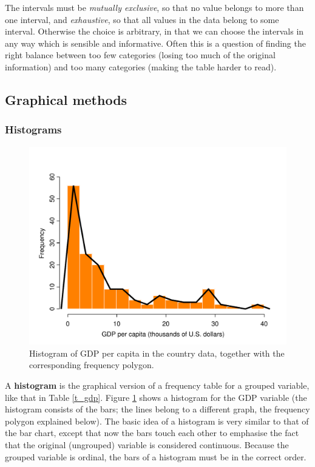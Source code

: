The intervals must be \emph{mutually exclusive}, so that no value
belongs to more than one interval, and \emph{exhaustive}, so that all
values in the data belong to some interval. Otherwise the choice is
arbitrary, in that we can choose the intervals in any way which is
sensible and informative. Often this is a question of finding the
right balance between too few categories (losing too much of the
original information) and too many categories (making the table harder
to read).

\subsection{Graphical methods}
\label{ss_descr1_1cont_graphs}

\subsubsection{Histograms}

\begin{figure}
\caption{Histogram of GDP per capita in the country data, together with
the corresponding frequency polygon.}
\label{f_hist_gdp}
\begin{center}
\vspace*{-6ex}
\includegraphics[width=13.5cm]{gdp}
\end{center}
\end{figure}

A \textbf{histogram} is the graphical version of a frequency
table for a grouped variable, like that in Table \ref{t_gdp}. Figure
\ref{f_hist_gdp} shows a histogram for the GDP variable (the histogram
consists of the bars; the lines belong to a different graph, the
frequency polygon explained below). The basic idea of a histogram is
very similar to that of the bar chart, except that now the bars touch
each other to emphasise the fact that the original (ungrouped) variable
is considered continuous. Because the grouped variable is ordinal, the
bars of a histogram must be in the correct order.

